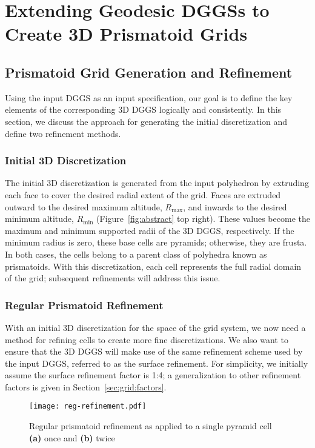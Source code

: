 \chapter{Extending Geodesic DGGSs to Create 3D Prismatoid Grids} \label{chap:extension}
\cite{sirdeshmukh2019utilizing}
\cite{xie2013interactive}


\section{Prismatoid Grid Generation and Refinement}
Using the input DGGS as an input specification, our goal is to define the key elements of the corresponding 3D DGGS logically and consistently.
In this section, we discuss the approach for generating the initial discretization and define two refinement methods.


\subsection{Initial 3D Discretization} \label{sec:grid:discretization}
The initial 3D discretization is generated from the input polyhedron by extruding each face to cover the desired radial extent of the grid.
Faces are extruded outward to the desired maximum altitude, $R_\mathrm{max}$, and inwards to the desired minimum altitude, $R_\mathrm{min}$ (Figure~\ref{fig:abstract} top right).
These values become the maximum and minimum supported radii of the 3D DGGS, respectively.
If the minimum radius is zero, these base cells are pyramids; otherwise, they are frusta.
In both cases, the cells belong to a parent class of polyhedra known as prismatoids.
With this discretization, each cell represents the full radial domain of the grid; subsequent refinements will address this issue.


\subsection{Regular Prismatoid Refinement} \label{sec:grid:regular}
With an initial 3D discretization for the space of the grid system, we now need a method for refining cells to create more fine discretizations.
We also want to ensure that the 3D DGGS will make use of the same refinement scheme used by the input DGGS, referred to as the surface refinement.
For simplicity, we initially assume the surface refinement factor is 1:4; a generalization to other refinement factors is given in Section~\ref{sec:grid:factors}.


\begin{figure}[h]
	\centering
	\texttt{[image: reg-refinement.pdf]}
	\caption{Regular prismatoid refinement as applied to a single pyramid cell \textbf{(a)} once and \textbf{(b)} twice}
	\label{fig:regular}
\end{figure}


